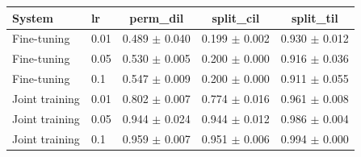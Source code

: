 \begin{tabular}{llccc}
\toprule
System & lr & perm\_dil & split\_cil & split\_til \\
\midrule
Fine-tuning & 0.01 & 0.489 $\pm$ 0.040 & 0.199 $\pm$ 0.002 & 0.930 $\pm$ 0.012 \\
Fine-tuning & 0.05 & 0.530 $\pm$ 0.005 & 0.200 $\pm$ 0.000 & 0.916 $\pm$ 0.036 \\
Fine-tuning & 0.1 & 0.547 $\pm$ 0.009 & 0.200 $\pm$ 0.000 & 0.911 $\pm$ 0.055 \\
Joint training & 0.01 & 0.802 $\pm$ 0.007 & 0.774 $\pm$ 0.016 & 0.961 $\pm$ 0.008 \\
Joint training & 0.05 & 0.944 $\pm$ 0.024 & 0.944 $\pm$ 0.012 & 0.986 $\pm$ 0.004 \\
Joint training & 0.1 & 0.959 $\pm$ 0.007 & 0.951 $\pm$ 0.006 & 0.994 $\pm$ 0.000 \\
\bottomrule
\end{tabular}

